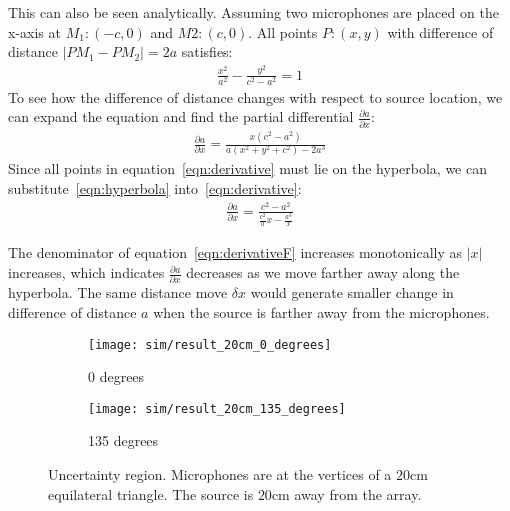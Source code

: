 This can also be seen analytically. Assuming two microphones are placed on the x-axis at $M_1:(-c,0)$ and $M2:(c,0)$. All points $P:(x,y)$ with difference of distance $ |PM_1 - PM_2| = 2a$ satisfies:
\begin{eqnarray}\label{eqn:hyperbola}
\frac{x^2}{a^2} - \frac{y^2}{c^2-a^2} = 1
\end{eqnarray}
To see how the difference of distance changes with respect to source location, we can expand the equation and find the partial differential $\frac{\partial a}{\partial x}$:
\begin{eqnarray}\label{eqn:derivative}
\frac{\partial a}{\partial x} = \frac{x(c^2-a^2)}{a(x^2+y^2+c^2)-2a^3}
\end{eqnarray}
Since all points in equation~\ref{eqn:derivative} must lie on the hyperbola, we can substitute~\ref{eqn:hyperbola} into~\ref{eqn:derivative}:
\begin{eqnarray}\label{eqn:derivativeF}
\frac{\partial a}{\partial x} = \frac{c^2-a^2}{\frac{c^2}{a}x - \frac{a^3}{x}}
\end{eqnarray}

The denominator of equation~\ref{eqn:derivativeF} increases monotonically as $|x|$ increases, which indicates $\frac{\partial a}{\partial x}$ decreases as we move farther away along the hyperbola. The same distance move $\delta x$ would generate smaller change in difference of distance $a$ when the source is farther away from the microphones. 

\begin{figure*}[]
  \centering
  \begin{subfigure}[]{.48\textwidth}
    \texttt{[image: sim/result\_20cm\_0\_degrees]}
    \caption{0 degrees}
  \end{subfigure}
  \begin{subfigure}[]{.48\textwidth}
    \texttt{[image: sim/result\_20cm\_135\_degrees]}
    \caption{135 degrees}
  \end{subfigure}
  \caption{Uncertainty region. Microphones are at the vertices of a $20$cm equilateral triangle. The source is $20$cm away from the array.}
  \label{fig:sim_3_2}
\end{figure*}

